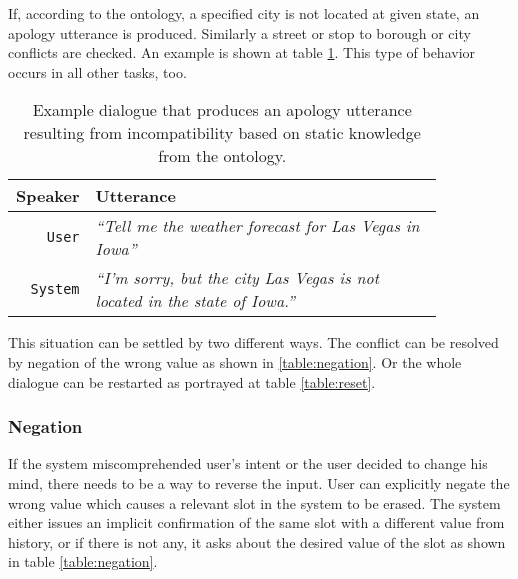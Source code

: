 If, according to the ontology, a specified city is not located at given state, an apology utterance is produced.
Similarly a street or stop to borough or city conflicts are checked.
An example is shown at table \ref{table:conflict}.
This type of behavior occurs in all other tasks, too.

\begin{table}[h]
\centering
\begin{tabular}{ | r | p{0.85\linewidth} | } \hline
	\textbf{Speaker} & \textbf{Utterance} \\ \hline
	\texttt{User} & \textit{``Tell me the weather forecast for Las Vegas in Iowa''} \\ \hline
	\texttt{System} & \textit{``I'm sorry, but the city Las Vegas is not located in the state of Iowa.''} \\ \hline
\end{tabular}
\caption[Conflict example of incompatible waypoints]{Example dialogue that produces an apology utterance resulting from incompatibility based on static knowledge from the ontology.}
\label{table:conflict}
\end{table}

This situation can be settled by two different ways.
The conflict can be resolved by negation of the wrong value as shown in \ref{table:negation}.
Or the whole dialogue can be restarted as portrayed at table \ref{table:reset}.

\subsubsection{Negation}

If the system miscomprehended user's intent or the user decided to change his mind, there needs to be a way to reverse the input.
User can explicitly negate the wrong value which causes a relevant slot in the system to be erased.
The system either issues an implicit confirmation of the same slot with a different value from history, or if there is not any, it asks about the desired value of the slot as shown in table \ref{table:negation}.

